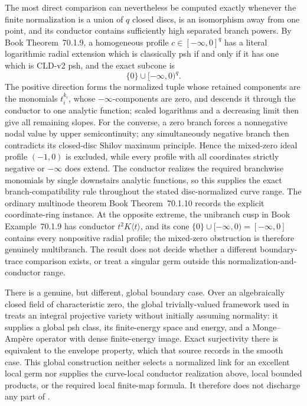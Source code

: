 \documentclass[11pt,a4paper]{article}
\theoremstyle{definition}
\theoremstyle{remark}
\begin{document}
The most direct comparison can nevertheless be computed exactly whenever
the finite normalization is a union of \(q\) closed discs, is an isomorphism
away from one point, and its conductor contains sufficiently high separated
branch powers.  By
Book Theorem~70.1.9, a homogeneous
profile \(c\in[-\infty,0]^q\) has a literal logarithmic radial extension
which is classically psh if and only if it has one which is CLD-v2 psh, and
the exact subcone is
\[
                         \{0\}\cup[-\infty,0)^q.
\]
The positive direction forms the normalized tuple whose retained components
are the monomials \(t_i^{k_i}\), whose \(-\infty\)-components are zero, and
descends it through the conductor to one analytic function; scaled
logarithms and a decreasing limit then give all remaining slopes.  For the
converse, a
zero branch forces a nonnegative nodal value by upper semicontinuity; any
simultaneously negative branch then contradicts its closed-disc Shilov
maximum principle.  Hence the mixed-zero ideal profile \((-1,0)\) is
excluded, while every profile with all coordinates strictly negative or
\(-\infty\) does extend.  The conductor realizes the required branchwise
monomials by single downstairs analytic functions, so this supplies the
exact branch-compatibility rule throughout the stated disc-normalized
curve range.  The ordinary multinode theorem
Book Theorem~70.1.10 records the explicit
coordinate-ring instance.  At the opposite extreme, the unibranch cusp in
Book Example~70.1.9 has conductor
\(t^2K\langle t\rangle\), and its cone
\(\{0\}\cup[-\infty,0)=[-\infty,0]\) contains every nonpositive radial
profile; the mixed-zero obstruction is therefore genuinely multibranch.
The result does not decide whether a different
boundary-trace comparison exists, or treat a singular germ outside this
normalization-and-conductor range.

There is a genuine, but different, global boundary case.  Over an
algebraically closed field of characteristic zero, the global
trivially-valued framework used in \cite[\S2]{BJKS2} treats an integral
projective variety without initially assuming normality: it supplies a
global psh class, its finite-energy space and energy, and a
Monge--Amp\`ere operator with dense finite-energy image.  Exact
surjectivity there is equivalent to the envelope property, which that
source records in the smooth case.  This global construction neither
selects a normalized link for an excellent local germ nor supplies the
curve-local conductor realization above, local bounded products, or the
required local finite-map formula.
It therefore does not discharge any part of
.
\end{document}
